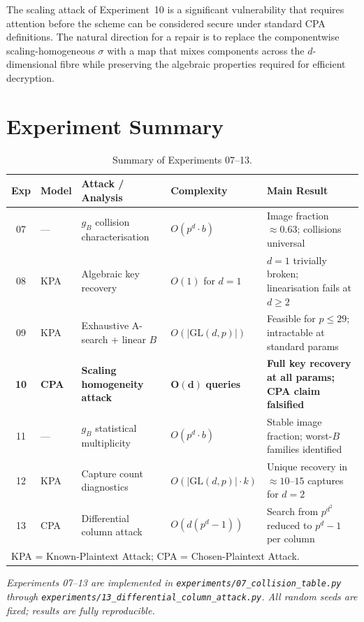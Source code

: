 \documentclass[12pt,a4paper]{article}
\theoremstyle{definition}
\newcommand{\GL}{\mathrm{GL}}
\begin{document}
The scaling attack of Experiment~10 is a significant vulnerability
that requires attention before the scheme can be considered secure
under standard CPA definitions. The natural direction for a repair
is to replace the componentwise scaling-homogeneous $\sigma$ with a
map that mixes components across the $d$-dimensional fibre while
preserving the algebraic properties required for efficient decryption.

\section*{Experiment Summary}

\begin{table}[h]
\centering
\caption{Summary of Experiments 07--13.}
\label{tab:summary}
\renewcommand{\arraystretch}{1.35}
\begin{tabularx}{\linewidth}{c l l l X}
\toprule
Exp & Model & Attack / Analysis & Complexity & Main Result \\
\midrule
07 & ---  & $g_B$ collision characterisation
           & $O(p^d \cdot b)$
           & Image fraction $\approx 0.63$; collisions universal \\
08 & KPA  & Algebraic key recovery
           & $O(1)$ for $d{=}1$
           & $d{=}1$ trivially broken; linearisation fails at $d{\geq}2$ \\
09 & KPA  & Exhaustive A-search + linear $B$
           & $O(|\GL(d,p)|)$
           & Feasible for $p \leq 29$; intractable at standard params \\
\textbf{10} & \textbf{CPA}
           & \textbf{Scaling homogeneity attack}
           & $\bm{O(d)}$ \textbf{queries}
           & \textbf{Full key recovery at all params; CPA claim falsified} \\
11 & ---  & $g_B$ statistical multiplicity
           & $O(p^d \cdot b)$
           & Stable image fraction; worst-$B$ families identified \\
12 & KPA  & Capture count diagnostics
           & $O(|\GL(d,p)| \cdot k)$
           & Unique recovery in $\approx 10$--$15$ captures for $d{=}2$ \\
13 & CPA  & Differential column attack
           & $O(d(p^d{-}1))$
           & Search from $p^{d^2}$ reduced to $p^d{-}1$ per column \\
\bottomrule
\multicolumn{5}{l}{\small KPA = Known-Plaintext Attack; \quad CPA = Chosen-Plaintext Attack.}
\end{tabularx}
\end{table}

\bigskip
\noindent
\textit{Experiments 07--13 are implemented in
\texttt{experiments/07\_collision\_table.py} through
\texttt{experiments/13\_differential\_column\_attack.py}.
All random seeds are fixed; results are fully reproducible.}
\end{document}
